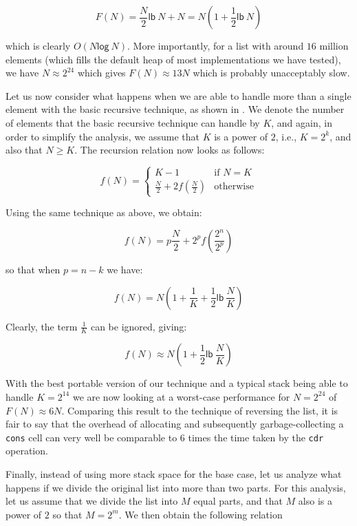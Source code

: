 \[ F(N) = \frac{N}{2}\mathsf{lb}~N + N = N(1 + \frac{1}{2}\mathsf{lb}~N)\]

which is clearly $O(N\mathsf{log}~N)$.  More importantly, for a list
with around $16$ million elements (which fills the default heap of most
implementations we have tested), we have $N \approx 2^{24}$ which
gives $F(N) \approx 13N$ which is probably unacceptably slow.

Let us now consider what happens when we are able to handle more than
a single element with the basic recursive technique, as shown in
.  We denote the number of elements that the
basic recursive technique can handle by $K$, and again, in order to
simplify the analysis, we assume that $K$ is a power of $2$, i.e., $K
= 2^k$, and also that $N \ge K$.  The recursion relation now looks as
follows:

\[ f(N) = \left\{ \begin{array}{ll}
                    K-1 & \mbox{if $N = K$} \\
                    \frac{N}{2} + 2f(\frac{N}{2}) &\mbox{otherwise}
                  \end{array} \right. \]

Using the same technique as above, we obtain:

\[ f(N) = p\frac{N}{2} + 2^pf(\frac{2^n}{2^p})\]

so that when $p = n - k$ we have:

\[ f(N) = N(1 + \frac{1}{K} + \frac{1}{2}\mathsf{lb}~\frac{N}{K})\]

Clearly, the term $\frac{1}{K}$ can be ignored, giving:

\[ f(N) \approx N(1 + \frac{1}{2}\mathsf{lb}~\frac{N}{K})\]

With the best portable version of our technique and a typical stack
being able to handle $K = 2^{14}$ we are now looking at a worst-case
performance for $N = 2^{24}$ of $F(N) \approx 6N$.  Comparing this
result to the technique of reversing the list, it is fair to say that
the overhead of allocating and subsequently garbage-collecting a
\texttt{cons} cell can very well be comparable to $6$ times the time
taken by the \texttt{cdr} operation.

Finally, instead of using more stack space for the base case, let us
analyze what happens if we divide the original list into more than two
parts.  For this analysis, let us assume that we divide the list into
$M$ equal parts, and that $M$ also is a power of $2$ so that $M =
2^m$.  We then obtain the following relation

